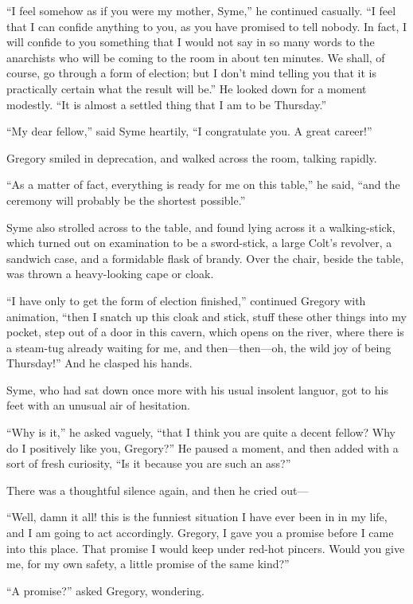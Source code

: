 “I feel somehow as if you were my mother, Syme,” he continued casually. “I feel that I can confide anything to you, as you have promised to tell nobody. In fact, I will confide to you something that I would not say in so many words to the anarchists who will be coming to the room in about ten minutes. We shall, of course, go through a form of election; but I don’t mind telling you that it is practically certain what the result will be.” He looked down for a moment modestly. “It is almost a settled thing that I am to be Thursday.”

“My dear fellow,” said Syme heartily, “I congratulate you. A great career!”

Gregory smiled in deprecation, and walked across the room, talking rapidly.

“As a matter of fact, everything is ready for me on this table,” he said, “and the ceremony will probably be the shortest possible.”

Syme also strolled across to the table, and found lying across it a walking-stick, which turned out on examination to be a sword-stick, a large Colt’s revolver, a sandwich case, and a formidable flask of brandy. Over the chair, beside the table, was thrown a heavy-looking cape or cloak.

“I have only to get the form of election finished,” continued Gregory with animation, “then I snatch up this cloak and stick, stuff these other things into my pocket, step out of a door in this cavern, which opens on the river, where there is a steam-tug already waiting for me, and then⁠—then⁠—oh, the wild joy of being Thursday!” And he clasped his hands.

Syme, who had sat down once more with his usual insolent languor, got to his feet with an unusual air of hesitation.

“Why is it,” he asked vaguely, “that I think you are quite a decent fellow? Why do I positively like you, Gregory?” He paused a moment, and then added with a sort of fresh curiosity, “Is it because you are such an ass?”

There was a thoughtful silence again, and then he cried out⁠—

“Well, damn it all! this is the funniest situation I have ever been in in my life, and I am going to act accordingly. Gregory, I gave you a promise before I came into this place. That promise I would keep under red-hot pincers. Would you give me, for my own safety, a little promise of the same kind?”

“A promise?” asked Gregory, wondering.

